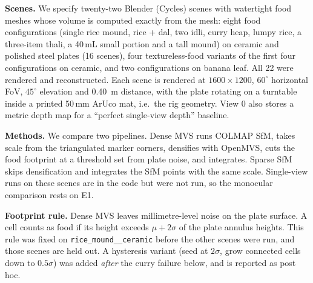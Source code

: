 \textbf{Scenes.} We specify twenty-two Blender (Cycles) scenes with watertight food meshes
whose volume is computed exactly from the mesh: eight food configurations
(single rice mound, rice + dal, two idli, curry heap, lumpy rice, a three-item
thali, a 40\,mL small portion and a tall mound) on ceramic and polished steel
plates (16 scenes), four textureless-food variants of the first four
configurations on ceramic, and two configurations on banana leaf. All 22 were
rendered and reconstructed. Each scene is rendered
at $1600\times1200$, $60^\circ$ horizontal FoV, $45^\circ$ elevation and
\SI{0.40}{m} distance, with the plate rotating on a turntable inside a printed
50\,mm ArUco mat, i.e.\ the rig geometry. View 0 also stores a metric depth map for a ``perfect single-view depth''
baseline.

\textbf{Methods.} We compare two pipelines. Dense MVS runs COLMAP SfM, takes
scale from the triangulated marker corners, densifies with OpenMVS, cuts the
food footprint at a threshold set from plate noise, and integrates. Sparse
SfM skips densification and integrates the SfM points with the same scale.
Single-view runs on these scenes are in the code but were not run, so the
monocular comparison rests on E1.

\textbf{Footprint rule.} Dense MVS leaves millimetre-level noise on the plate
surface. A cell counts as food if its height exceeds $\mu+2\sigma$ of the plate
annulus heights. This rule was fixed on \texttt{rice\_mound\_\_ceramic} before
the other scenes were run, and those scenes are held out. A hysteresis variant
(seed at $2\sigma$, grow connected cells down to $0.5\sigma$) was added
\emph{after} the curry failure below, and is reported as post hoc.

\begin{table}[t]
\centering
\caption{E3 on synthetic plates with exact mesh volume. Error columns give the
median absolute error with a 95\% bootstrap CI across scenes; bias is the mean
signed error. Time: CPU seconds per scene on our VM.}
\label{tab:synth}
\footnotesize
{}
\end{table}

